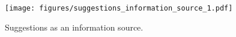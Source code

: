 \begin{figure}
    \centering
    \texttt{[image: figures/suggestions\_information\_source\_1.pdf]}
    \caption{Suggestions as an information source.}
    \label{fig:suggestion_info_source}
\end{figure}
